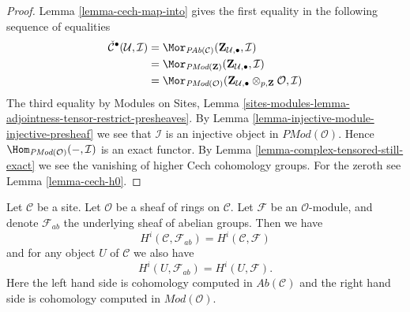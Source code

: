 \begin{proof}
Lemma \ref{lemma-cech-map-into} gives the first equality in the following
sequence of equalities
\begin{align*}
\check{\mathcal{C}}^\bullet(\mathcal{U}, \mathcal{I})
& =
\Mor_{\textit{PAb}(\mathcal{C})}(
\mathbf{Z}_{\mathcal{U}, \bullet}, \mathcal{I}) \\
& =
\Mor_{\textit{PMod}(\mathbf{Z})}(
\mathbf{Z}_{\mathcal{U}, \bullet}, \mathcal{I}) \\
& =
\Mor_{\textit{PMod}(\mathcal{O})}(
\mathbf{Z}_{\mathcal{U}, \bullet} \otimes_{p, \mathbf{Z}} \mathcal{O},
\mathcal{I})
\end{align*}
The third equality by
Modules on Sites,
Lemma \ref{sites-modules-lemma-adjointness-tensor-restrict-presheaves}.
By Lemma \ref{lemma-injective-module-injective-presheaf}
we see that $\mathcal{I}$ is an injective object in
$\textit{PMod}(\mathcal{O})$.
Hence $\Hom_{\textit{PMod}(\mathcal{O})}(-, \mathcal{I})$
is an exact functor. By
Lemma \ref{lemma-complex-tensored-still-exact} we see the vanishing of
higher Cech cohomology groups.
For the zeroth see Lemma \ref{lemma-cech-h0}.
\end{proof}

\begin{lemma}
\label{lemma-cohomology-modules-abelian-agree}
Let $\mathcal{C}$ be a site.
Let $\mathcal{O}$ be a sheaf of rings on $\mathcal{C}$.
Let $\mathcal{F}$ be an $\mathcal{O}$-module, and denote
$\mathcal{F}_{ab}$ the underlying sheaf of abelian groups.
Then we have
$$
H^i(\mathcal{C}, \mathcal{F}_{ab})
=
H^i(\mathcal{C}, \mathcal{F})
$$
and for any object $U$ of $\mathcal{C}$ we also have
$$
H^i(U, \mathcal{F}_{ab})
=
H^i(U, \mathcal{F}).
$$
Here the left hand side is cohomology computed in
$\textit{Ab}(\mathcal{C})$ and the right hand side
is cohomology computed in $\textit{Mod}(\mathcal{O})$.
\end{lemma}

